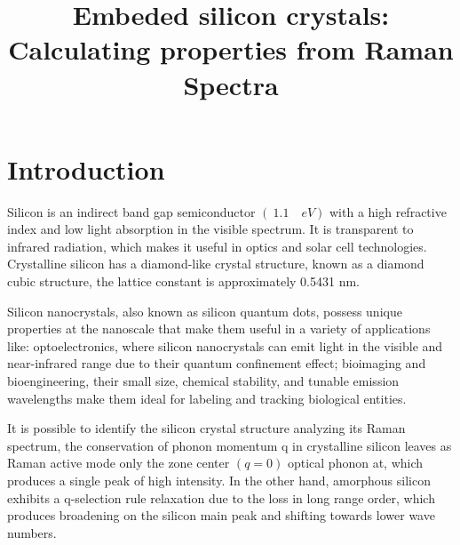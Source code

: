 \documentclass[a4paper,10pt,twocolumn]{article}
\title{Embeded silicon crystals: Calculating properties from Raman Spectra}
\author{}
\begin{document}

\section{Introduction}

Silicon is an indirect band gap semiconductor $ (~1.1 \quad eV) $ with a high refractive index and low light absorption in the visible spectrum. It is transparent to infrared radiation, which makes it useful in optics and solar cell technologies. Crystalline silicon has a diamond-like crystal structure, known as a diamond cubic structure, the lattice constant is approximately 0.5431 nm.

Silicon nanocrystals, also known as silicon quantum dots, possess unique properties at the nanoscale that make them useful in a variety of applications like: optoelectronics, where silicon nanocrystals can emit light in the visible and near-infrared range due to their quantum confinement effect; bioimaging and bioengineering, their small size, chemical stability, and tunable emission wavelengths make them ideal for labeling and tracking biological entities.

It is possible to identify the silicon crystal structure analyzing its Raman spectrum, the conservation of phonon momentum q in crystalline silicon leaves as Raman active mode only the zone center $(q=0) $ optical phonon at, which produces a single peak of high intensity. In the other hand, amorphous silicon exhibits a q-selection rule relaxation due to the loss in long range order, which produces broadening on the silicon main peak and shifting towards lower wave numbers.
\end{document}

